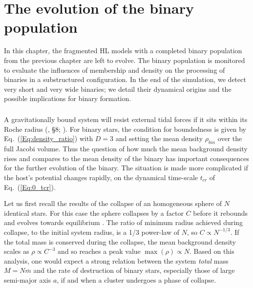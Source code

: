 \chapter{The evolution of the binary population}


In this chapter, the fragmented HL models with a completed binary population from the previous chapter are left to evolve. The binary population is monitored to evaluate the influences of membership and density on the processing of binaries in a substructured configuration. In the end of the simulation, we detect very short and very wide binaries; we detail their dynamical origins and the possible implications for binary formation.

\minitoc


\paragraph*{}

A gravitationally bound system will resist external tidal forces if it sits within its Roche radius (\citealt{BT}, \S8; \citealt{Renaud2011}). For binary stars, the condition for boundedness is given by Eq.~(\ref{Eq:density_ratio})  with $D = 3$ and setting the mean density $\rho_{bin}$ over the full Jacobi volume. Thus the question of how much the mean background density rises and  compares to the mean density of the binary has important consequences for the further evolution of the binary. The situation is made more complicated if the host's potential changes rapidly, on the  dynamical time-scale $t_{cr}$ of Eq.~(\ref{Eq:0_tcr}). 

Let us first recall the results of the collapse of an homogeneous sphere of $N$ identical stars. For this case the sphere collapses by a factor $C$ before it rebounds and evolves towards equilibrium \citep{Aarseth1988,Boily2002}. The ratio of minimum radius achieved during collapse, to the initial system radius, is a 1/3 power-law of $N$, so $ C \propto N^{-1/3}$. 
If the total mass is conserved during the collapse, the mean background density scales as $\rho \propto C^{-3}$ and so reaches a peak value $\max(\rho) \propto N$. Based on this analysis, one would expect a strong relation between the system {\it total} mass $M = N \overline{m}$ and the rate of destruction of binary stars, especially those of large semi-major axis $a$, if and when a cluster undergoes a phase of collapse.

